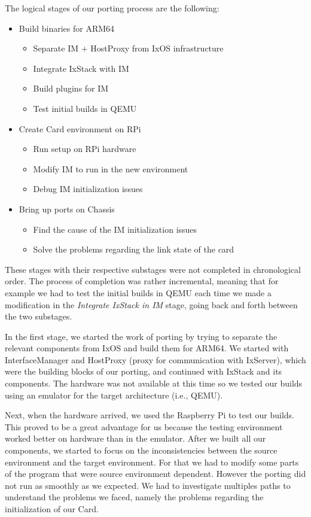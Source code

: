The logical stages of our porting process are the following:
\begin{itemize}
    \item Build binaries for ARM64
    \begin{itemize}
        \item Separate IM + HostProxy from IxOS infrastructure
        \item Integrate IxStack with IM
        \item Build plugins for IM
        \item Test initial builds in QEMU
    \end{itemize}
    \item Create Card environment on RPi
    \begin{itemize}
        \item Run setup on RPi hardware
        \item Modify IM to run in the new environment
        \item Debug IM initialization issues
    \end{itemize}
    \item Bring up ports on Chassis
    \begin{itemize}
        \item Find the cause of the IM initialization issues
        \item Solve the problems regarding the link state of the card
    \end{itemize}
\end{itemize}
These stages with their respective substages were not completed in chronological
order. The process of completion was rather incremental, meaning that for
example we had to test the initial builds in QEMU each time we made a
modification in the \textit{Integrate IxStack in IM} stage, going back and forth
between the two substages.


In the first stage, we started the work of porting by trying to separate the
relevant components from IxOS and build them for ARM64. We started with
InterfaceManager and HostProxy (proxy for communication with IxServer), which
were the building blocks of our porting, and continued with IxStack and its
components. The hardware was not available at this time so we tested our builds
using an emulator for the target architecture (i.e., QEMU).

Next, when the hardware arrived, we used the Raspberry Pi to test our builds.
This proved to be a great advantage for us because the testing environment
worked better on hardware than in the emulator. After we built all our
components, we started to focus on the inconsistencies between the source
environment and the target environment. For that we had to modify some parts of
the program that were source environment dependent. However the porting did not
run as smoothly as we expected. We had to investigate multiples paths to
understand the problems we faced, namely the problems regarding the
initialization of our Card.


